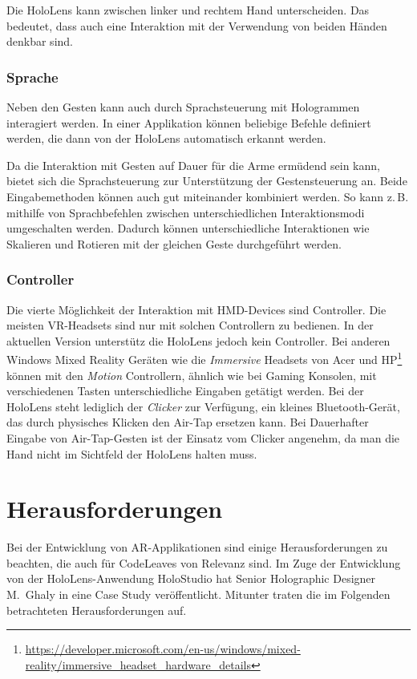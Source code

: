 Die HoloLens kann zwischen linker und rechtem Hand unterscheiden. Das bedeutet, dass auch eine Interaktion mit der Verwendung von beiden Händen denkbar sind.

\subsubsection*{Sprache}
Neben den Gesten kann auch durch Sprachsteuerung mit Hologrammen interagiert werden. In einer Applikation können beliebige Befehle definiert werden, die dann von der HoloLens automatisch erkannt werden.

Da die Interaktion mit Gesten auf Dauer für die Arme ermüdend sein kann, bietet sich die Sprachsteuerung zur Unterstützung der Gestensteuerung an. Beide Eingabemethoden können auch gut miteinander kombiniert werden. So kann z.\,B. mithilfe von Sprachbefehlen zwischen unterschiedlichen Interaktionsmodi umgeschalten werden. Dadurch können unterschiedliche Interaktionen wie Skalieren und Rotieren mit der gleichen Geste durchgeführt werden.

\subsubsection*{Controller}
Die vierte Möglichkeit der Interaktion mit HMD-Devices sind Controller. Die meisten VR-Headsets sind nur mit solchen Controllern zu bedienen. In der aktuellen Version unterstütz die HoloLens jedoch kein Controller. Bei anderen Windows Mixed Reality Geräten wie die \textit{Immersive} Headsets von Acer und HP\footnote{\url{https://developer.microsoft.com/en-us/windows/mixed-reality/immersive_headset_hardware_details}} können mit den \textit{Motion} Controllern, ähnlich wie bei Gaming Konsolen, mit verschiedenen Tasten unterschiedliche Eingaben getätigt werden. Bei der HoloLens steht lediglich der \textit{Clicker} zur Verfügung, ein kleines Bluetooth-Gerät, das durch physisches Klicken den Air-Tap ersetzen kann. Bei Dauerhafter Eingabe von Air-Tap-Gesten ist der Einsatz vom Clicker angenehm, da man die Hand nicht im Sichtfeld der HoloLens halten muss.

\section{Herausforderungen}

Bei der Entwicklung von AR-Applikationen sind einige Herausforderungen zu beachten, die auch für CodeLeaves von Relevanz sind. Im Zuge der Entwicklung von der HoloLens-Anwendung HoloStudio hat Senior Holographic Designer M.\ Ghaly in \cite{windows2017casestudy3} eine Case Study veröffentlicht. Mitunter traten die im Folgenden betrachteten Herausforderungen auf.

